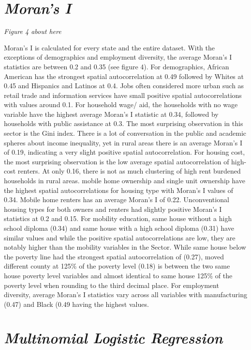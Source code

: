 \section{\textit{Moran's I}}

\textit{Figure 4 about here}

Moran’s I is calculated for every state and the entire dataset. With the exceptions of demographics and employment diversity, the average Moran's I statistics are between 0.2 and 0.35 (see figure 4). For demographics, African American has the strongest spatial autocorrelation at 0.49 followed by Whites at 0.45 and Hispanics and Latinos at 0.4. Jobs often considered more urban such as retail trade and information services have small positive spatial autocorrelations with values around 0.1. For household wage/ aid, the households with no wage variable have the highest average Moran’s I statistic at 0.34, followed by households with public assistance at 0.3. The most surprising observation in this sector is the Gini index. There is a lot of conversation in the public and academic spheres about income inequality, yet in rural areas there is an average Moran’s I of 0.19, indicating a very slight positive spatial autocorrelation. For housing cost, the most surprising observation is the low average spatial autocorrelation of high-cost renters. At only 0.16, there is not as much clustering of high rent burdened households in rural areas. mobile home ownership and single unit ownership have the highest spatial autocorrelations for housing type with Moran’s I values of 0.34.  Mobile home renters has an average Moran’s I of 0.22. Unconventional housing types for both owners and renters had slightly positive Moran’s I statistics at 0.2 and 0.15. For mobility education, same house without a high school diploma (0.34) and same house with a high school diploma (0.31) have similar values and while the positive spatial autocorrelations are low, they are notably higher than the mobility variables in the Sector. While same house below the poverty line had the strongest spatial autocorrelation of (0.27), moved different county at 125\% of the poverty level (0.18) is between the two same house poverty level variables and almost identical to same house 125\% of the poverty level when rounding to the third decimal place. For employment diversity, average Moran’s I statistics vary across all variables with manufacturing (0.47) and Black (0.49 having the highest values.  


\section{\textit{Multinomial Logistic Regression}}

